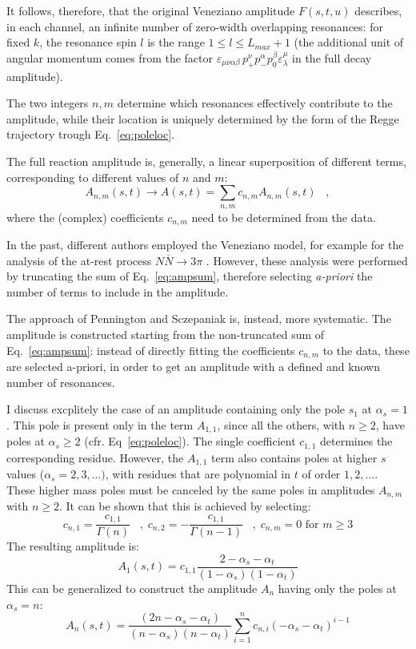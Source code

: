 \documentclass[a4paper,10pt]{report}
\begin{document}
It follows, therefore, that the original Veneziano amplitude $F(s,t,u)$ describes, in each channel,
an infinite number of zero-width overlapping resonances: for fixed $k$, the resonance spin $l$ is the range $1 \leq l \leq L_{max}+1$ 
(the additional unit of angular momentum comes from the factor $\varepsilon_{\mu \nu \alpha \beta}\, p^{\nu}_{+}p^{\alpha}_{-}p^{\beta}_{0}\varepsilon^{\mu}_{\lambda}$ in the full decay amplitude).

The two integers $n,m$ determine which resonances effectively contribute to the amplitude, while their location is uniquely determined by the form of the Regge trajectory trough Eq.~\ref{eq:poleloc}.

The full reaction amplitude is, generally, a linear superposition of different terms, corresponding to different values of $n$ and $m$:
\begin{equation}\label{eq:ampsum}
A_{n,m}(s,t) \rightarrow A(s,t) = \sum_{n,m} c_{n,m}A_{n,m}(s,t) \; \; \; ,
\end{equation}
where the (complex) coefficients $c_{n,m}$ need to be determined from the data.

In the past, different authors employed the Veneziano model, for example for the analysis of the at-rest process $N\overline{N}\rightarrow 3\pi$ \cite{Lovelace,Altarelli,Gopal}.
However, these analysis were performed by truncating the sum of Eq.~\ref{eq:ampsum}, therefore selecting \textit{a-priori} the number of terms to include in the amplitude.

The approach of Pennington and Sczepaniak is, instead, more systematic. 
The amplitude is constructed starting from the non-truncated sum of Eq.~\ref{eq:ampsum}: instead of directly fitting the coefficients $c_{n,m}$ to the data, these are
selected a-priori, in order to get an amplitude with a defined and known number of resonances. 

I discuss excplitely the case of an amplitude containing only the pole $s_1$ at $\alpha_s=1$. This pole is present only in the term $A_{1,1}$, since all the others, with $n\geq2$,
have poles at $\alpha_s\geq2$ (cfr. Eq~\ref{eq:poleloc}). The single coefficient $c_{1,1}$ determines the corresponding residue.
However, the $A_{1,1}$ term also contains poles at higher $s$ values ($\alpha_s=2,3,\ldots)$, with residues that are polynomial in $t$ of order $1,2,\ldots$.
These higher mass poles must be canceled by the same poles in amplitudes $A_{n,m}$ with $n\geq2$. It can be shown that this is achieved by selecting:
\begin{equation}
c_{n,1} = \frac{c_{1,1}}{\Gamma(n)} \; \; \; , \;  c_{n,2} = - \frac{c_{1,1}}{\Gamma(n-1)} \; \; \; , \; c_{n,m} = 0 \mbox{ for $m\geq 3$}
\end{equation}
The resulting amplitude is:
\begin{equation}
A_{1}(s,t)=c_{1,1}\frac{2-\alpha_s-\alpha_t}{(1-\alpha_s)(1-\alpha_t)}
\end{equation}
This can be generalized to construct the amplitude $A_{n}$ having only the poles at $\alpha_s=n$:
\begin{equation}
A_{n}(s,t)=\frac{(2n-\alpha_s-\alpha_t)}{(n-\alpha_s)(n-\alpha_t)}\sum_{i=1}^n c_{n,i} (-\alpha_s-\alpha_t)^{i-1}
\end{equation}
\end{document}
